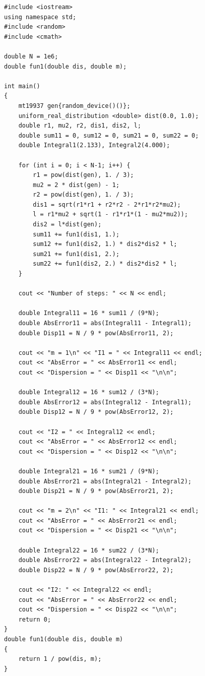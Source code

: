 \documentclass[
11pt,
master, %
subf, %
href, %
colorlinks=true, %
times, %
]{disser}
\begin{document}
{\footnotesize
\begin{verbatim}
#include <iostream>
using namespace std;
#include <random>
#include <cmath>

double N = 1e6;
double fun1(double dis, double m);

int main()
{
    mt19937 gen{random_device()()};
    uniform_real_distribution <double> dist(0.0, 1.0);
    double r1, mu2, r2, dis1, dis2, l;
    double sum11 = 0, sum12 = 0, sum21 = 0, sum22 = 0;
    double Integral1(2.133), Integral2(4.000);

    for (int i = 0; i < N-1; i++) {
        r1 = pow(dist(gen), 1. / 3);
        mu2 = 2 * dist(gen) - 1;
        r2 = pow(dist(gen), 1. / 3);
        dis1 = sqrt(r1*r1 + r2*r2 - 2*r1*r2*mu2);
        l = r1*mu2 + sqrt(1 - r1*r1*(1 - mu2*mu2));
        dis2 = l*dist(gen);
        sum11 += fun1(dis1, 1.);
        sum12 += fun1(dis2, 1.) * dis2*dis2 * l;
        sum21 += fun1(dis1, 2.);
        sum22 += fun1(dis2, 2.) * dis2*dis2 * l;
    }

    cout << "Number of steps: " << N << endl;

    double Integral11 = 16 * sum11 / (9*N);
    double AbsError11 = abs(Integral11 - Integral1);
    double Disp11 = N / 9 * pow(AbsError11, 2);

    cout << "m = 1\n" << "I1 = " << Integral11 << endl;
    cout << "AbsError = " << AbsError11 << endl;
    cout << "Dispersion = " << Disp11 << "\n\n";

    double Integral12 = 16 * sum12 / (3*N);
    double AbsError12 = abs(Integral12 - Integral1);
    double Disp12 = N / 9 * pow(AbsError12, 2);

    cout << "I2 = " << Integral12 << endl;
    cout << "AbsError = " << AbsError12 << endl;
    cout << "Dispersion = " << Disp12 << "\n\n";

    double Integral21 = 16 * sum21 / (9*N);
    double AbsError21 = abs(Integral21 - Integral2);
    double Disp21 = N / 9 * pow(AbsError21, 2);

    cout << "m = 2\n" << "I1: " << Integral21 << endl;
    cout << "AbsError = " << AbsError21 << endl;
    cout << "Dispersion = " << Disp21 << "\n\n";

    double Integral22 = 16 * sum22 / (3*N);
    double AbsError22 = abs(Integral22 - Integral2);
    double Disp22 = N / 9 * pow(AbsError22, 2);

    cout << "I2: " << Integral22 << endl;
    cout << "AbsError = " << AbsError22 << endl;
    cout << "Dispersion = " << Disp22 << "\n\n";
    return 0;
}
double fun1(double dis, double m)
{
    return 1 / pow(dis, m);
}
\end{verbatim}
}
\end{document}
